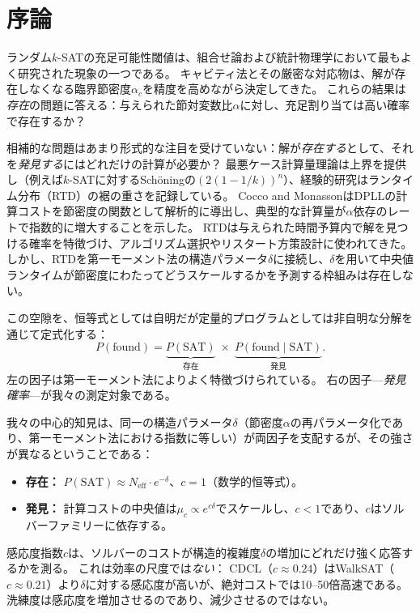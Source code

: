 \documentclass[11pt,a4paper]{article}
\newcommand{\mc}{\mu_c}
\newcommand{\Neff}{N_{\text{eff}}}
\newcommand{\Pfound}{P(\text{found})}
\newcommand{\PSAT}{P(\text{SAT})}
\newcommand{\PfSAT}{P(\text{found}\mid\text{SAT})}
\begin{document}
\section{序論}
\label{sec:intro}

ランダム$k$-SATの充足可能性閾値は、組合せ論および統計物理学において最もよく研究された現象の一つである\cite{MPZ2009}。
キャビティ法とその厳密な対応物は、解が存在しなくなる臨界節密度$\alpha_c$を精度を高めながら決定してきた\cite{Achlioptas2008,Ding2015}。
これらの結果は\emph{存在}の問題に答える：与えられた節対変数比$\alpha$に対し、充足割り当ては高い確率で存在するか？

相補的な問題はあまり形式的な注目を受けていない：解が\emph{存在する}として、それを\emph{発見する}にはどれだけの計算が必要か？
最悪ケース計算量理論は上界を提供し（例えば$k$-SATに対するSch\"oningの$(2(1-1/k))^n$\cite{Schoening1999}）、経験的研究はランタイム分布（RTD）の裾の重さを記録している\cite{Gomes2000,Coarfa2003,Hoos1999,Frost1997}。
Cocco and Monasson\cite{CoccoMonasson2001}はDPLLの計算コストを節密度の関数として解析的に導出し、典型的な計算量が$\alpha$依存のレートで指数的に増大することを示した。
RTDは与えられた時間予算内で解を見つける確率を特徴づけ、アルゴリズム選択やリスタート方策設計に使われてきた\cite{Hoos1999}。
しかし、RTDを第一モーメント法の構造パラメータ$\delta$に接続し、$\delta$を用いて中央値ランタイムが節密度にわたってどうスケールするかを予測する枠組みは存在しない。

この空隙を、恒等式としては自明だが定量的プログラムとしては非自明な分解を通じて定式化する：
\begin{equation}
\label{eq:decomposition}
\Pfound = \underbrace{\PSAT}_{\text{存在}} \;\times\;
          \underbrace{\PfSAT}_{\text{発見}}.
\end{equation}
左の因子は第一モーメント法によりよく特徴づけられている。
右の因子---\emph{発見確率}---が我々の測定対象である。

我々の中心的知見は、同一の構造パラメータ$\delta$（節密度$\alpha$の再パラメータ化であり、第一モーメント法における指数に等しい）が両因子を支配するが、その強さが異なるということである：
\begin{itemize}
\item \textbf{存在：} $\PSAT \approx \Neff \cdot e^{-\delta}$、$c = 1$（数学的恒等式）。
\item \textbf{発見：} 計算コストの中央値は$\mc \propto e^{c\delta}$でスケールし、$c < 1$であり、$c$はソルバーファミリーに依存する。
\end{itemize}
感応度指数$c$は、ソルバーのコストが構造的複雑度$\delta$の増加にどれだけ強く応答するかを測る。
これは効率の尺度では\emph{ない}：
CDCL（$c \approx 0.24$）はWalkSAT（$c \approx 0.21$）より$\delta$に対する感応度が高いが、絶対コストでは10--50倍高速である。
洗練度は感応度を増加させるのであり、減少させるのではない。
\end{document}
